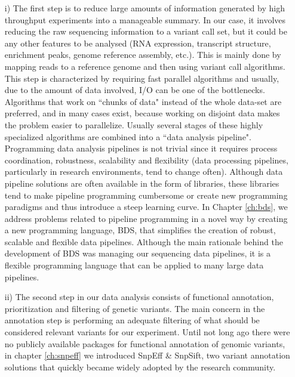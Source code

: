 \begin{itemize}
\item[i)] The first step is to reduce large amounts of information generated by high throughput experiments into a manageable summary. 
In our case, it involves reducing the raw sequencing information to a variant call set, but it could be any other features to be analysed (RNA expression, transcript structure, enrichment peaks, genome reference assembly, etc.). 
This is mainly done by mapping reads to a reference genome and then using variant call algorithms. 
This step is characterized by requiring fast parallel algorithms and usually, due to the amount of data involved, I/O can be one of the bottlenecks. Algorithms that work on ``chunks of data" instead of the whole data-set are preferred, and in many cases exist, because working on disjoint data makes the problem easier to parallelize. 
Usually several stages of these highly specialized algorithms are combined into a ``data analysis pipeline". 
Programming data analysis pipelines is not trivial since it requires process coordination, robustness, scalability and flexibility (data processing pipelines, particularly in research environments, tend to change often). 
Although data pipeline solutions are often available in the form of libraries, these libraries tend to make pipeline programming cumbersome or create new programming paradigms and thus introduce a steep learning curve. 
In Chapter \ref{ch:bds}, we address problems related to pipeline programming in a novel way by creating a new programming language, BDS, that simplifies the creation of robust, scalable and flexible data pipelines. 
Although the main rationale behind the development of BDS was managing our sequencing data pipelines, it is a flexible programming language that can be applied to many large data pipelines.

\item[ii)] The second step in our data analysis consists of functional annotation, prioritization and filtering of genetic variants. 
The main concern in the annotation step is performing an adequate filtering of what should be considered relevant variants for our experiment. 
Until not long ago there were no publicly available packages for functional annotation of genomic variants, in chapter \ref{ch:snpeff} we introduced SnpEff \& SnpSift, two variant annotation solutions that quickly became widely adopted by the research community. 


\end{itemize}
